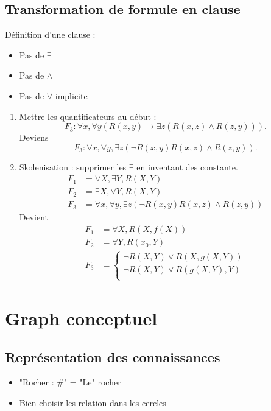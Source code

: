 \documentclass{article}
\theoremstyle{plain}%
\theoremstyle{definition}
\theoremstyle{remark}
\begin{document}
\subsection{Transformation de formule en clause}
Définition d'une clause : 
\begin{itemize}
    \item Pas de $ \exists  $ 
    \item Pas de $ \wedge  $ 
    \item Pas de $ \forall  $ implicite
\end{itemize}
\begin{enumerate}
    \item Mettre les quantificateurs au début : 
    \[
        F_3 : \forall x, \forall y (R(x,y) \to \exists z (R(x,z) \wedge R(z,y)))
    .\]
    Deviens 
    \[
        F_3 : \forall x, \forall y, \exists z (\neg R(x,y) R(x,z) \wedge R(z,y))
    .\]
    \item Skolenisation : supprimer les $ \exists  $ en inventant des constante. \begin{align*}
        F_1 &= \forall X, \exists Y, R(X,Y) \\
        F_2 &= \exists X, \forall Y, R(X,Y) \\
        F_3 &= \forall x, \forall y, \exists z (\neg R(x,y) R(x,z) \wedge R(z,y))
    \end{align*}
    Devient \begin{align*}
        F_1 &= \forall X, R(X, f(X)) \\
        F_2 &= \forall Y, R(x_0, Y) \\
        F_3 &= \begin{cases}
        \neg R(X,Y) \vee R(X, g(X,Y)) \\
        \neg R(X,Y) \vee R(g(X,Y), Y) \\
        \end{cases} 
    \end{align*}
\end{enumerate}

\section{Graph conceptuel}
\subsection{Représentation des connaissances}
\begin{itemize}
    \item "Rocher : \#" = "Le" rocher
    \item Bien choisir les relation dans les cercles
\end{itemize}
\end{document}
